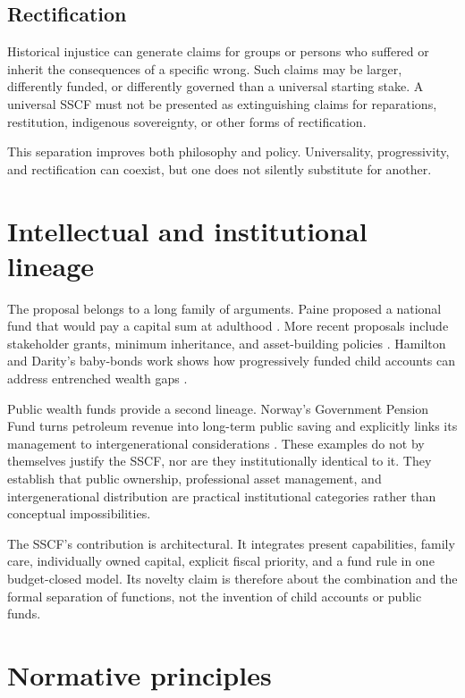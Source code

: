 \documentclass[11pt]{article}
\begin{document}
\subsection{Rectification}

Historical injustice can generate claims for groups or persons who suffered or inherit
the consequences of a specific wrong. Such claims may be larger, differently funded,
or differently governed than a universal starting stake. A universal SSCF must not be
presented as extinguishing claims for reparations, restitution, indigenous sovereignty,
or other forms of rectification.

This separation improves both philosophy and policy. Universality, progressivity, and
rectification can coexist, but one does not silently substitute for another.

\section{Intellectual and institutional lineage}

The proposal belongs to a long family of arguments. Paine proposed a national fund that
would pay a capital sum at adulthood \cite{paine1797}. More recent proposals include
stakeholder grants, minimum inheritance, and asset-building policies
\cite{ackerman1999,atkinson2015,sherraden1991}. Hamilton and Darity's baby-bonds work
shows how progressively funded child accounts can address entrenched wealth gaps
\cite{hamilton2010}.

Public wealth funds provide a second lineage. Norway's Government Pension Fund turns
petroleum revenue into long-term public saving and explicitly links its management to
intergenerational considerations \cite{norwayfund}. These examples do not by themselves
justify the SSCF, nor are they institutionally identical to it. They establish that
public ownership, professional asset management, and intergenerational distribution are
practical institutional categories rather than conceptual impossibilities.

The SSCF's contribution is architectural. It integrates present capabilities, family
care, individually owned capital, explicit fiscal priority, and a fund rule in one
budget-closed model. Its novelty claim is therefore about the combination and the
formal separation of functions, not the invention of child accounts or public funds.

\section{Normative principles}
\end{document}
